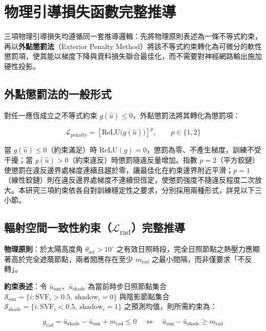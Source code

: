 \section{物理引導損失函數完整推導}
\label{appx:physics_loss_derivation}

三項物理引導損失均遵循同一套推導邏輯：先將物理原則表述為一條不等式約束，再以\textbf{外點懲罰法}（Exterior Penalty Method）將該不等式約束轉化為可微分的軟性懲罰項，使其能以梯度下降與資料損失聯合最佳化，而不需要對神經網路輸出施加硬性投影。

\subsection{外點懲罰法的一般形式}

對任一應恆成立之不等式約束 $g(\hat{u}) \le 0$，外點懲罰法將其轉化為懲罰項：

\begin{equation}
    \mathcal{L}_{\text{penalty}} = \left[\text{ReLU}\big(g(\hat{u})\big)\right]^p,\qquad p \in \{1, 2\}
    \label{eq:exterior_penalty_general}
\end{equation}

當 $g(\hat{u}) \le 0$（約束滿足）時 $\text{ReLU}(g)=0$，懲罰為零、不產生梯度，訓練不受干擾；當 $g(\hat{u}) > 0$（約束違反）時懲罰隨違反量增加。指數 $p=2$（平方鉸鏈）使懲罰在違反邊界處梯度連續且趨於零，讓最佳化在約束邊界附近平滑；$p=1$（線性鉸鏈）則在違反邊界處梯度不連續但恆定，使懲罰強度不隨違反程度二次放大。本研究三項約束依各自對訓練穩定性之要求，分別採用兩種形式，詳見以下三小節。

\subsection{輻射空間一致性約束（$\mathcal{L}_{\text{rad}}$）完整推導}

\noindent\textbf{物理原則}：於太陽高度角 $\theta_{\text{sol}} > 10^\circ$ 之有效日照時段，完全日照節點之熱壓力應顯著高於完全遮蔭節點，兩者間應存在至少 $m_{\text{rad}}$ 之最小間隔，而非僅要求「不反轉」。

\noindent\textbf{約束表述}：令 $\bar{u}_{\text{sun}}$、$\bar{u}_{\text{shade}}$ 為當前時步日照節點集合 $\mathcal{S}_{\text{sun}} = \{i : \text{SVF}_i > 0.5,\ \text{shadow}_i = 0\}$ 與陰影節點集合 $\mathcal{S}_{\text{shade}} = \{i : \text{SVF}_i < 0.5,\ \text{shadow}_i = 1\}$ 之預測均值，則所需約束為：

\begin{equation}
    g_{\text{rad}} = \bar{u}_{\text{shade}} - \bar{u}_{\text{sun}} + m_{\text{rad}} \le 0
    \quad\Longleftrightarrow\quad
    \bar{u}_{\text{sun}} - \bar{u}_{\text{shade}} \ge m_{\text{rad}}
    \label{eq:rad_constraint}
\end{equation}

